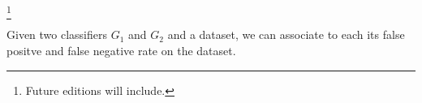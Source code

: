 
\footnote{Future editions will include.}


Given two classifiers $G_1$ and $G_2$ and a dataset, we can associate to each its false positve and false negative rate on the dataset.

\blankpage
